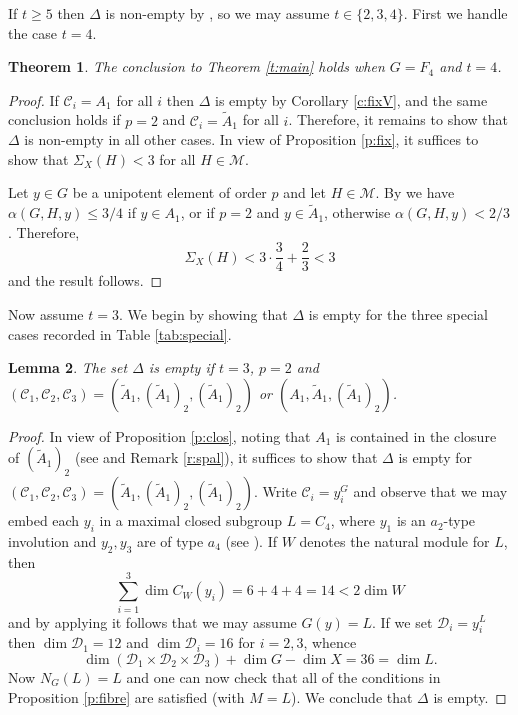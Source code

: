 \documentclass[twoside,a4paper,reqno,11pt]{amsart}
\renewcommand{\a}{\alpha}
\newcommand{\<}{\langle}
\renewcommand{\>}{\rangle}
\newcommand{\leqs}{\leqslant}
\newcommand{\geqs}{\geqslant}
\renewcommand{\:}{\colon}
\theoremstyle{plain}
\newtheorem{thm}{Theorem}[section]
\newtheorem{lem}[thm]{Lemma}
\theoremstyle{definition}
\begin{document}
If $t \geqs 5$ then $\Delta$ is non-empty by \cite[Theorem 7]{BGG1}, so we may assume $t \in \{2,3,4\}$. First we handle the case $t=4$.

\begin{thm}\label{t:f4_4}
The conclusion to Theorem \ref{t:main} holds when $G = F_4$ and $t=4$.
\end{thm}

\begin{proof}
If $\mathcal{C}_i = A_1$ for all $i$ then $\Delta$ is empty by Corollary \ref{c:fixV}, and the same conclusion holds if $p=2$ and $\mathcal{C}_i = \tilde{A}_1$ for all $i$. Therefore, it remains to show that $\Delta$ is non-empty in all other cases. In view of Proposition \ref{p:fix}, it suffices to show that $\Sigma_X(H)<3$ for all $H \in \mathcal{M}$. 

Let $y \in G$ be a unipotent element of order $p$ and let $H \in \mathcal{M}$. By \cite[Theorem 3.1]{BGG1} we have $\a(G,H,y) \leqs 3/4$ if $y \in A_1$, or if $p=2$ and $y \in \tilde{A}_1$, otherwise $\a(G,H,y)<2/3$. Therefore,
\[
\Sigma_X(H) < 3\cdot \frac{3}{4}+\frac{2}{3} < 3
\]
and the result follows.
\end{proof}

Now assume $t=3$. We begin by showing that $\Delta$ is empty for the three special cases recorded in Table \ref{tab:special}.

\begin{lem}\label{l:f4_30}
 The set $\Delta$ is empty if $t=3$, $p=2$ and $(\mathcal{C}_1,\mathcal{C}_2,\mathcal{C}_3) = (\tilde{A}_1,(\tilde{A}_1)_2,(\tilde{A}_1)_2)$ or $(A_1,\tilde{A}_1,(\tilde{A}_1)_2)$.
\end{lem}

\begin{proof}
In view of Proposition \ref{p:clos}, noting that $A_1$ is contained in the closure of $(\tilde{A}_1)_2$ (see \cite{Spal} and Remark \ref{r:spal}), it suffices to show that $\Delta$ is empty for $(\mathcal{C}_1,\mathcal{C}_2,\mathcal{C}_3) = (\tilde{A}_1,(\tilde{A}_1)_2,(\tilde{A}_1)_2)$. Write $\mathcal{C}_i = y_i^G$ and observe that we may embed each $y_i$ in a maximal closed subgroup $L = C_4$, where $y_1$ is an $a_2$-type involution and $y_2, y_3$ are of type $a_4$ (see \cite[Section 4.5]{Law2}). If $W$ denotes the natural module for $L$, then
\[
\sum_{i=1}^3 \dim C_W(y_i) = 6+4+4 = 14 < 2\dim W
\]
and by applying \cite[Theorem 7]{BGG2} it follows that we may assume $G(y) = L$. If we set $\mathcal{D}_i = y_i^L$ then $\dim \mathcal{D}_1 = 12$ and $\dim \mathcal{D}_i = 16$ for $i=2,3$, whence
\[
\dim (\mathcal{D}_1 \times \mathcal{D}_2 \times \mathcal{D}_3) + \dim G - \dim X = 36 = \dim L.
\]
Now $N_G(L) = L$ and one can now check that all of the conditions in Proposition \ref{p:fibre} are satisfied (with $M=L$). We conclude that $\Delta$ is empty.
\end{proof}
\end{document}
